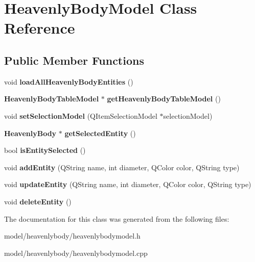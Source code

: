 \section{\-Heavenly\-Body\-Model \-Class \-Reference}
\label{d5/dae/classHeavenlyBodyModel}
\subsection*{\-Public \-Member \-Functions}
\begin{DoxyCompactItemize}
\item 
void {\bfseries load\-All\-Heavenly\-Body\-Entities} ()\label{d5/dae/classHeavenlyBodyModel_a6930a1f2cabc1b5c715faeefa255b9b6}

\item 
{\bf \-Heavenly\-Body\-Table\-Model} $\ast$ {\bfseries get\-Heavenly\-Body\-Table\-Model} ()\label{d5/dae/classHeavenlyBodyModel_a8237cf4cab0e6b3b154ba7e4f70f9d56}

\item 
void {\bfseries set\-Selection\-Model} (\-Q\-Item\-Selection\-Model $\ast$selection\-Model)\label{d5/dae/classHeavenlyBodyModel_a13d3799b8e3ee537fdebe61a419160a9}

\item 
{\bf \-Heavenly\-Body} $\ast$ {\bfseries get\-Selected\-Entity} ()\label{d5/dae/classHeavenlyBodyModel_abc32e9a6e31b96a93d4dcd31e736be17}

\item 
bool {\bfseries is\-Entity\-Selected} ()\label{d5/dae/classHeavenlyBodyModel_aebbc9b5febaa4e709e6f2c433f7f99f5}

\item 
void {\bfseries add\-Entity} (\-Q\-String name, int diameter, \-Q\-Color color, \-Q\-String type)\label{d5/dae/classHeavenlyBodyModel_a181897be2a2724104384115dcf625457}

\item 
void {\bfseries update\-Entity} (\-Q\-String name, int diameter, \-Q\-Color color, \-Q\-String type)\label{d5/dae/classHeavenlyBodyModel_ad37a9019aa8a0f21a94b07d10b81e50b}

\item 
void {\bfseries delete\-Entity} ()\label{d5/dae/classHeavenlyBodyModel_a5d9f5cfdc3a128959ec9bd88ace1226f}

\end{DoxyCompactItemize}


\-The documentation for this class was generated from the following files\-:\begin{DoxyCompactItemize}
\item 
model/heavenlybody/heavenlybodymodel.\-h\item 
model/heavenlybody/heavenlybodymodel.\-cpp\end{DoxyCompactItemize}
